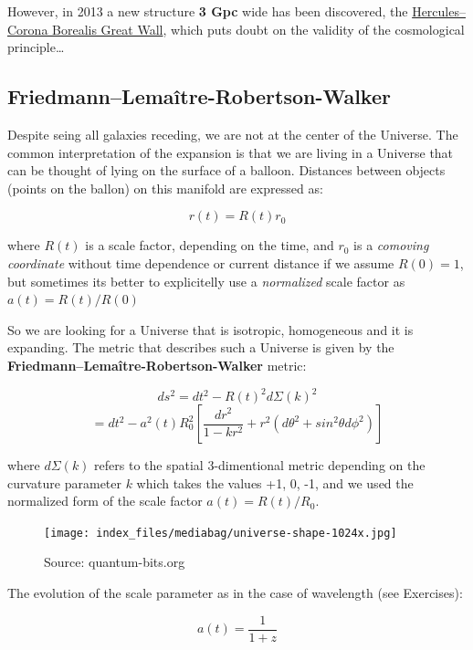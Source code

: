 \documentclass[
  letterpaper,
  DIV=11,
  numbers=noendperiod]{scrreprt}
\begin{document}
However, in 2013 a new structure \textbf{3 Gpc} wide has been
discovered, the \href{http://arxiv.org/abs/1311.1104}{Hercules--Corona
Borealis Great Wall}, which puts doubt on the validity of the
cosmological principle\ldots{}

\subsection*{Friedmann--Lemaître-Robertson-Walker}\label{friedmannlemauxeetre-robertson-walker}

Despite seing all galaxies receding, we are not at the center of the
Universe. The common interpretation of the expansion is that we are
living in a Universe that can be thought of lying on the surface of a
balloon. Distances between objects (points on the ballon) on this
manifold are expressed as:

\[r(t) = R(t)r_0\]

where \(R(t)\) is a scale factor, depending on the time, and \(r_0\) is
a \emph{comoving coordinate} without time dependence or current distance
if we assume \(R(0) = 1\), but sometimes its better to explicitelly use
a \emph{normalized} scale factor as \(a(t) = R(t)/R(0)\)

So we are looking for a Universe that is isotropic, homogeneous and it
is expanding. The metric that describes such a Universe is given by the
\textbf{Friedmann--Lemaître-Robertson-Walker} metric:

\[ds^2 = dt^2 - R(t)^2 d \Sigma(k)^2 \]
\[= dt^2 - a^2(t)R^2_0\left[\frac{dr^2}{1 - kr^2} + r^2(d\theta^2  + sin^2\theta d\phi^2)\right]\]

where \(d\Sigma(k)\) refers to the spatial 3-dimentional metric
depending on the curvature parameter \(k\) which takes the values +1, 0,
-1, and we used the normalized form of the scale factor
\(a(t) = R(t)/R_0\).

\begin{figure}[H]

{\centering \texttt{[image: index\_files/mediabag/universe-shape-1024x.jpg]}

}

\caption{Source: quantum-bits.org}

\end{figure}%

The evolution of the scale parameter as in the case of wavelength (see
Exercises):

\[a(t) = \frac{1}{1+z}\]
\end{document}
